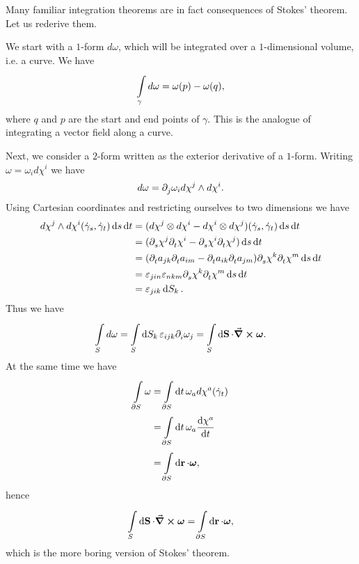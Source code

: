 Many familiar integration theorems are in fact consequences of Stokes' theorem. Let us rederive them.

We start with a $1$-form $d\omega$, which will be integrated over a $1$-dimensional volume, i.e. a curve. We have
\begin{align*}
	\int\limits_{\gamma}^{}d\omega = \omega(p) - \omega(q),
\end{align*}
where $q$ and $p$ are the start and end points of $\gamma$. This is the analogue of integrating a vector field along a curve.

Next, we consider a $2$-form written as the exterior derivative of a $1$-form. Writing $\omega = \omega_{i}d\chi^{i}$ we have
\begin{align*}
d\omega = \partial^{}_{j}{\omega_{i}}d\chi^{j}\wedge d\chi^{i}.
\end{align*}
Using Cartesian coordinates and restricting ourselves to two dimensions we have
\begin{align*}
	d\chi^{j}\wedge d\chi^{i}(\dot{\gamma}_{s}, \dot{\gamma}_{t})\dd{s}\dd{t} &= (d\chi^{j}\otimes d\chi^{i} - d\chi^{i}\otimes d\chi^{j})(\dot{\gamma}_{s}, \dot{\gamma}_{t})\dd{s}\dd{t} \\
	                                                                                 &= (\partial^{}_{s}{\chi^{j}}\partial^{}_{t}{\chi^{i}} - \partial^{}_{s}{\chi^{i}}\partial^{}_{t}{\chi^{j}})\dd{s}\dd{t} \\
	                                                                                 &= (\partial^{}_{t}a_{jk}\partial^{}_{t}a_{im} - \partial^{}_{t}a_{ik}\partial^{}_{t}a_{jm})\partial^{}_{s}{\chi^{k}}\partial^{}_{t}{\chi^{m}}\dd{s}\dd{t} \\
	                                                                                 &= \varepsilon_{jin}\varepsilon_{nkm}\partial^{}_{s}{\chi^{k}}\partial^{}_{t}{\chi^{m}}\dd{s}\dd{t} \\
	                                                                                 &= \varepsilon_{jik}\dd{S_{k}}.
\end{align*}
Thus we have
\begin{align*}
	\int\limits_{S}^{}d\omega = \int\limits_{S}^{}\dd{S_{k}}{\varepsilon_{ijk}\ensuremath{\partial^{}_{i}}{\omega_{j}}} = \int\limits_{S}^{}\dd{\vb{S}}{\cdot\curl{\vb*{\omega}}}.
\end{align*}
At the same time we have
\begin{align*}
	\int\limits_{\partial S}^{}{\omega} &= \int\limits_{\partial S}^{}\dd{t}{\omega_{a}\ensuremath{d\chi^{a}}(\dot{\gamma}_{t})} \\
	                           &= \int\limits_{\partial S}^{}\dd{t}{\omega_{a}\dv{\chi^{a}}{t}} \\
	                           &= \int\limits_{\partial S}^{}\dd{\vb{r}}{\cdot\vb*{\omega}},
\end{align*}
hence
\begin{align*}
	\int\limits_{S}^{}\dd{\vb{S}}{\cdot\curl{\vb*{\omega}}} = \int\limits_{\partial S}^{}\dd{\vb{r}}{\cdot\vb*{\omega}},
\end{align*}
which is the more boring version of Stokes' theorem.

